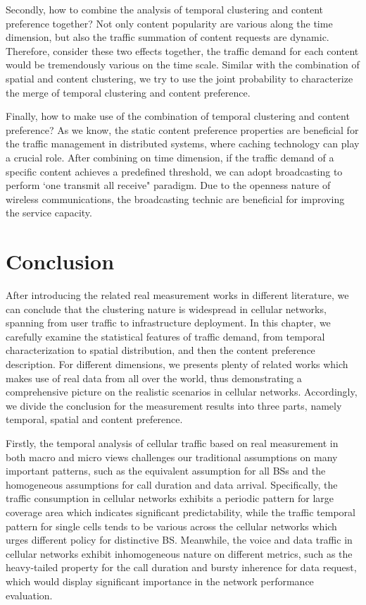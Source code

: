 Secondly, how to combine the analysis of temporal clustering and content preference together? Not only content popularity are various along the time dimension, but also the traffic summation of content requests are dynamic. Therefore, consider these two effects together, the traffic demand for each content would be tremendously various on the time scale. Similar with the combination of spatial and content clustering, we try to use the joint probability to characterize the merge of temporal clustering and content preference.

Finally, how to make use of the combination of temporal clustering and content preference? As we know, the static content preference properties are beneficial for the traffic management in distributed systems, where caching technology can play a crucial role. After combining on time dimension, if the traffic demand of a specific content achieves a predefined threshold, we can adopt broadcasting to perform `one transmit all receive" paradigm. Due to the openness nature of wireless communications, the broadcasting technic are beneficial for improving the service capacity.

\section{Conclusion}
After introducing the related real measurement works in different literature, we can conclude that the clustering nature is widespread in cellular networks, spanning from user traffic to infrastructure deployment. In this chapter, we carefully examine the statistical features of traffic demand, from temporal characterization to spatial distribution, and then the content preference description. For different dimensions, we presents plenty of related works which makes use of real data from all over the world, thus demonstrating a comprehensive picture on the realistic scenarios in cellular networks. Accordingly, we divide the conclusion for the measurement results into three parts, namely temporal, spatial and content preference.

Firstly, the temporal analysis of cellular traffic based on real measurement in both macro and micro views challenges our traditional assumptions on many important patterns, such as the equivalent assumption for all BSs and the homogeneous assumptions for call duration and data arrival. Specifically, the traffic consumption in cellular networks exhibits a periodic pattern for large coverage area which indicates significant predictability, while the traffic temporal pattern for single cells tends to be various across the cellular networks which urges different policy for distinctive BS. Meanwhile, the voice and data traffic in cellular networks exhibit inhomogeneous nature on different metrics, such as the heavy-tailed property for the call duration and bursty inherence for data request, which would display significant importance in the network performance evaluation.

